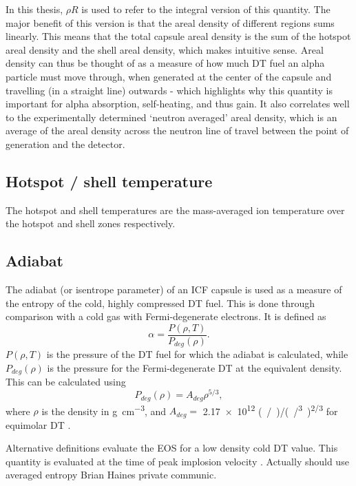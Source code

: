 In this thesis, $\rho R$ is used to refer to the integral version of this quantity. The major benefit of this version is that the areal density of different regions sums linearly. This means that the total capsule areal density is the sum of the hotspot areal density and the shell areal density, which makes intuitive sense. Areal density can thus be thought of as a measure of how much DT fuel an alpha particle must move through, when generated at the center of the capsule and travelling (in a straight line) outwards - which highlights why this quantity is important for alpha absorption, self-heating, and thus gain. It also correlates well to the experimentally determined `neutron averaged' areal density, which is an average of the areal density across the neutron line of travel between the point of generation and the detector.

\subsection{Hotspot / shell temperature}
The hotspot and shell temperatures are the mass-averaged ion temperature over the hotspot and shell zones respectively.

\subsection{Adiabat}

The adiabat (or isentrope parameter) of an ICF capsule is used as a measure of the entropy of the cold, highly compressed DT fuel. This is done through comparison with a cold gas with Fermi-degenerate electrons. It is defined as \begin{equation} \alpha = \frac{P(\rho, T)}{P_{deg}(\rho)} . \end{equation} $P(\rho, T)$ is the pressure of the DT fuel for which the adiabat is calculated, while $P_{deg}(\rho)$ is the pressure for the Fermi-degenerate DT at the equivalent density. This can be calculated using \begin{equation} P_{deg}(\rho) = A_{deg} \rho^{5/3}, \end{equation} where $\rho$ is the density in \unit{\gram\per\centi\meter\cubed}, and $A_{deg} = $ \num{2.17e12} \unit{(/)/(/^3)^{2/3}} for equimolar DT \cite{Atzeni2008}.

Alternative definitions evaluate the EOS for a low density cold DT value. This quantity is evaluated at the time of peak implosion velocity \cite{Park2014}. Actually should use averaged entropy \cite{Haan2011} \cite{Haines2022} Brian Haines private communic.

